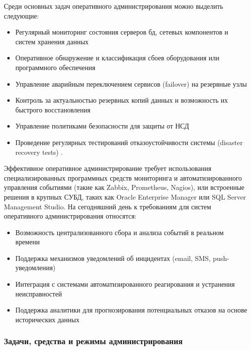 Среди основных задач оперативного администрирования можно выделить следующие:
\begin{itemize}
    \item Регулярный мониторинг состояния серверов бд, сетевых компонентов и систем хранения данных
    \item Оперативное обнаружение и классификация сбоев оборудования или программного обеспечения
    \item Управление аварийным переключением сервисов (failover) на резервные узлы
    \item Контроль за актуальностью резервных копий данных и возможность их быстрого восстановления
    \item Управление политиками безопасности для защиты от НСД
    \item Проведение регулярных тестирований отказоустойчивости системы (disaster recovery tests) \autocite{Kleppmann}.
\end{itemize}

Эффективное оперативное администрирование требует использования специализированных программных средств мониторинга и автоматизированного управления событиями (такие как Zabbix, Prometheus, Nagios), или встроенные решения в крупных СУБД, таких как Oracle Enterprise Manager или SQL Server Management Studio.
На сегодняшний день к требованиям для систем оперативного администрирования относятся:
\begin{itemize}
    \item Возможность централизованного сбора и анализа событий в реальном времени
    \item Поддержка механизмов уведомлений об инцидентах (email, SMS, push-уведомления)
    \item Интеграция с системами автоматизированного реагирования и устранения неисправностей
    \item Поддержка аналитики для прогнозирования потенциальных отказов на основе исторических данных \autocite{Afonin}
\end{itemize}




\subsubsection{Задачи, средства и режимы администрирования}


